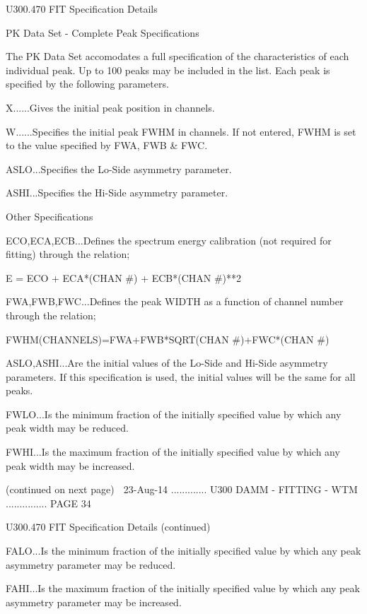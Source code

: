    U300.470  FIT Specification Details
 
                   PK  Data Set - Complete Peak Specifications
 
   The PK Data Set accomodates a full specification of the characteristics  of
   each  individual  peak.  Up  to 100 peaks may be included in the list. Each
   peak is specified by the following parameters.
 
   X......Gives the initial peak position in channels.
 
   W......Specifies the initial peak FWHM in channels. If  not  entered,  FWHM
          is set to the value specified by FWA, FWB & FWC.
 
   ASLO...Specifies the Lo-Side asymmetry parameter.
 
   ASHI...Specifies the Hi-Side asymmetry parameter.
 
                              Other Specifications
 
   ECO,ECA,ECB...Defines  the  spectrum  energy  calibration (not required for
          fitting) through the relation;
 
          E = ECO + ECA*(CHAN #) + ECB*(CHAN #)**2
 
   FWA,FWB,FWC...Defines the peak  WIDTH  as  a  function  of  channel  number
          through the relation;
 
          FWHM(CHANNELS)=FWA+FWB*SQRT(CHAN #)+FWC*(CHAN #)
 
   ASLO,ASHI...Are  the  initial  values  of the Lo-Side and Hi-Side asymmetry
          parameters. If this specification is used, the initial  values  will
          be the same for all peaks.
 
   FWLO...Is  the  minimum  fraction of the initially specified value by which
          any peak width may be reduced.
 
   FWHI...Is the maximum fraction of the initially specified  value  by  which
          any peak width may be increased.
 
                            (continued on next page)
    
   23-Aug-14 ............. U300  DAMM - FITTING - WTM ............... PAGE  34
 
   U300.470  FIT Specification Details (continued)
 
   FALO...Is  the  minimum  fraction of the initially specified value by which
          any peak asymmetry parameter may be reduced.
 
   FAHI...Is the maximum fraction of the initially specified  value  by  which
          any peak asymmetry parameter may be increased.
 
